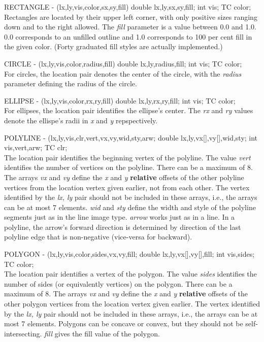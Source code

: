 RECTANGLE - (lx,ly,vis,color,sx,sy,fill) double lx,ly,sx,sy,fill; int
vis; TC color;\\
Rectangles are located by their upper left corner, with only positive sizes
ranging down and to the right allowed.  The {\em fill} parameter is a value
between 0.0 and 1.0.  0.0 corresponds to an unfilled outline and 1.0
corresponds  to 100 per cent fill in the given color.  (Forty graduated fill
styles are actually implemented.)

CIRCLE - (lx,ly,vis,color,radius,fill) double lx,ly,radius,fill; int
vis; TC color;\\
For circles, the location pair denotes the center of the circle, with the
{\em radius} parameter defining the radius of the circle.

ELLIPSE - (lx,ly,vis,color,rx,ry,fill) double lx,ly,rx,ry,fill; int
vis; TC color;\\
For ellipses, the location pair identifies the ellipse's center.  The
{\em rx}
and {\em ry} values denote the ellispe's radii in {\em x} and {\em y}
repspectively.

POLYLINE - (lx,ly,vis,clr,vert,vx,vy,wid,sty,arw; double
lx,ly,vx[],vy[],wid,sty; int vis,vert,arw; TC clr;\\
The location pair identifies the beginning vertex of the polyline.  The value
{\em vert} identifies the number of vertices on the polyline.
There can be a maximum of 8.  The arrays {\em vx} and {\em vy} define the
{\em x} and {\em y} {\bf relative} offsets of the other polyline vertices from
the location vertex given earlier, not from each other.  The vertex identified
by the {\em lx, ly} pair should not be included in these arrays, i.e., the
arrays can be at most 7 elements.  {\em wid} and {\em sty} define the width
and style of the polyline segments just as in the line image type.
{\em arrow} works just as in a line. In a polyline, the arrow's forward
direction is determined by direction of the last polyline edge that is
non-negative (vice-versa for backward).

POLYGON - (lx,ly,vis,color,sides,vx,vy,fill; double lx,ly,vx[],vy[],fill; int
vis,sides; TC color;\\
The location pair identifies a vertex of the polygon.  The value {\em sides}
identifies the number of sides (or equivalently vertices) on the polygon.
There can be a maximum of 8.  The arrays {\em vx} and {\em vy} define the
{\em x} and {\em y} {\bf relative} offsets of the other polygon vertices from
the location vertex given earlier.  The vertex identified by the {\em lx, ly}
pair should not be included in these arrays, i.e., the arrays can be at most 7
elements.  Polygons can be concave or convex, but they should not be
self-intersecting.  {\em fill} gives the fill value of the polygon.

